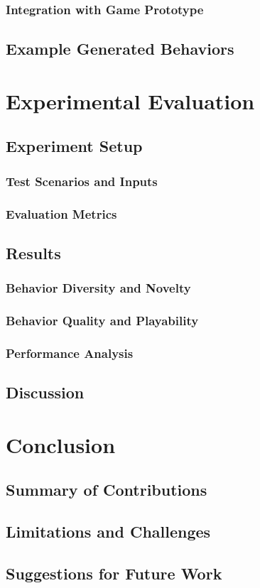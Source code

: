 \documentclass[12pt, twoside, openany]{book}
\begin{document}
	\subsection{Integration with Game Prototype}
	\section{Example Generated Behaviors}
	
	\chapter{Experimental Evaluation}
	\section{Experiment Setup}
	\subsection{Test Scenarios and Inputs}
	\subsection{Evaluation Metrics}
	\section{Results}
	\subsection{Behavior Diversity and Novelty}
	\subsection{Behavior Quality and Playability}
	\subsection{Performance Analysis}
	\section{Discussion}
	
	\chapter{Conclusion}
	\section{Summary of Contributions}
	\section{Limitations and Challenges}
	\section{Suggestions for Future Work}
	
	
	
	\backmatter
	
	\nocite{*}
	
	
	
	
\end{document}
